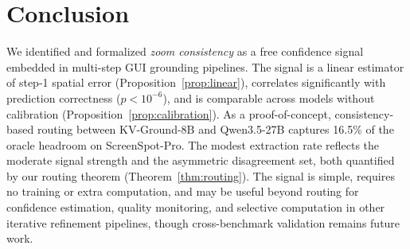 \documentclass{article}
\begin{document}
\section{Conclusion}

We identified and formalized \emph{zoom consistency} as a free confidence signal embedded in multi-step GUI grounding pipelines. The signal is a linear estimator of step-1 spatial error (Proposition~\ref{prop:linear}), correlates significantly with prediction correctness ($p < 10^{-6}$), and is comparable across models without calibration (Proposition~\ref{prop:calibration}). As a proof-of-concept, consistency-based routing between KV-Ground-8B and Qwen3.5-27B captures 16.5\% of the oracle headroom on ScreenSpot-Pro. The modest extraction rate reflects the moderate signal strength and the asymmetric disagreement set, both quantified by our routing theorem (Theorem~\ref{thm:routing}). The signal is simple, requires no training or extra computation, and may be useful beyond routing for confidence estimation, quality monitoring, and selective computation in other iterative refinement pipelines, though cross-benchmark validation remains future work.



\end{document}

